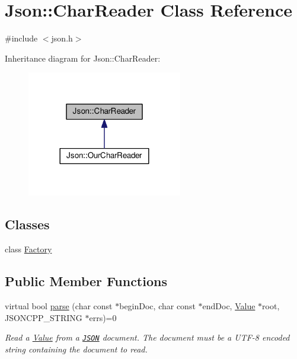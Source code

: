 \hypertarget{class_json_1_1_char_reader}{}\section{Json\+:\+:Char\+Reader Class Reference}
\label{class_json_1_1_char_reader}


{\ttfamily \#include $<$json.\+h$>$}



Inheritance diagram for Json\+:\+:Char\+Reader\+:
\nopagebreak
\begin{figure}[H]
\begin{center}
\leavevmode
\includegraphics[width=192pt]{class_json_1_1_char_reader__inherit__graph}
\end{center}
\end{figure}
\subsection*{Classes}
\begin{DoxyCompactItemize}
\item 
class \hyperlink{class_json_1_1_char_reader_1_1_factory}{Factory}
\end{DoxyCompactItemize}
\subsection*{Public Member Functions}
\begin{DoxyCompactItemize}
\item 
virtual bool \hyperlink{class_json_1_1_char_reader_a7983680d50fd0745f371c43b162e78e1}{parse} (char const $\ast$begin\+Doc, char const $\ast$end\+Doc, \hyperlink{class_json_1_1_value}{Value} $\ast$root, J\+S\+O\+N\+C\+P\+P\+\_\+\+S\+T\+R\+I\+NG $\ast$errs)=0
\begin{DoxyCompactList}\small\item\em Read a \hyperlink{class_json_1_1_value}{Value} from a \href{http://www.json.org}{\tt J\+S\+ON} document. The document must be a U\+T\+F-\/8 encoded string containing the document to read. \end{DoxyCompactList}\end{DoxyCompactItemize}


